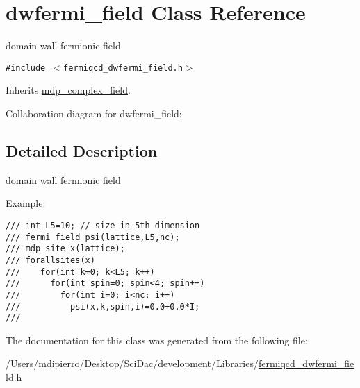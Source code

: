 \hypertarget{classdwfermi__field}{
\section{dwfermi\_\-field Class Reference}
\label{classdwfermi__field}
}
domain wall fermionic field  


{\tt \#include $<$fermiqcd\_\-dwfermi\_\-field.h$>$}

Inherits \hyperlink{classmdp__complex__field}{mdp\_\-complex\_\-field}.

Collaboration diagram for dwfermi\_\-field:

\subsection{Detailed Description}
domain wall fermionic field 

Example: 

\footnotesize\begin{verbatim}
/// int L5=10; // size in 5th dimension 
/// fermi_field psi(lattice,L5,nc);
/// mdp_site x(lattice);
/// forallsites(x)
///    for(int k=0; k<L5; k++)
///      for(int spin=0; spin<4; spin++)
///        for(int i=0; i<nc; i++)
///          psi(x,k,spin,i)=0.0+0.0*I;
/// \end{verbatim}
\normalsize
 

The documentation for this class was generated from the following file:\begin{CompactItemize}
\item 
/Users/mdipierro/Desktop/SciDac/development/Libraries/\hyperlink{fermiqcd__dwfermi__field_8h}{fermiqcd\_\-dwfermi\_\-field.h}\end{CompactItemize}
